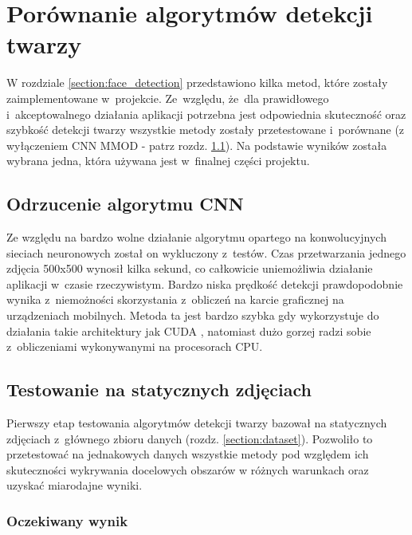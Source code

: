 \newpage

\section{Porównanie algorytmów detekcji twarzy}

W rozdziale \hyperref[{section:face_detection}]{\ref{section:face_detection}} przedstawiono kilka metod, które zostały zaimplementowane w~projekcie. Ze~względu, że~dla prawidłowego i~akceptowalnego działania aplikacji potrzebna jest odpowiednia skuteczność oraz szybkość detekcji twarzy wszystkie metody zostały przetestowane i~porównane (z wyłączeniem CNN MMOD - patrz rozdz. \hyperref[{section:no_cnn}]{\ref{section:no_cnn}}). Na podstawie wyników została wybrana jedna, która używana jest w~finalnej części projektu.


\subsection{Odrzucenie algorytmu CNN} \label{section:no_cnn}

Ze względu na bardzo wolne działanie algorytmu opartego na konwolucyjnych sieciach neuronowych został on wykluczony z~testów. Czas przetwarzania jednego zdjęcia 500x500 wynosił kilka sekund, co całkowicie uniemożliwia działanie aplikacji w~czasie rzeczywistym. Bardzo niska prędkość detekcji prawdopodobnie wynika z~niemożności skorzystania z~obliczeń na karcie graficznej na urządzeniach mobilnych. Metoda ta jest bardzo szybka gdy wykorzystuje do działania takie architektury jak CUDA \cite{nvidia_cuda}, natomiast dużo gorzej radzi sobie z~obliczeniami wykonywanymi na procesorach CPU.

\subsection{Testowanie na statycznych zdjęciach}

Pierwszy etap testowania algorytmów detekcji twarzy bazował na statycznych zdjęciach z~głównego zbioru danych (rozdz. \hyperref[section:dataset]{\ref{section:dataset}}). Pozwoliło to przetestować na jednakowych danych wszystkie metody pod względem ich skuteczności wykrywania docelowych obszarów w różnych warunkach oraz uzyskać miarodajne wyniki.

\subsubsection{Oczekiwany wynik}

